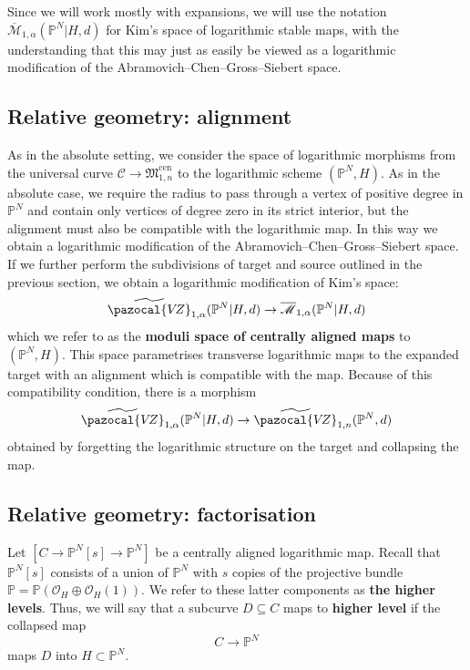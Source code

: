 \documentclass[11pt]{amsart}
\newcommand{\PP}{\mathbb P}
\newcommand{\VZ}{\pazocal{V\!Z}}
\renewcommand{\to}{\rightarrow}
\newcommand{\Mcal}{\mathcal{M}}
\newcommand{\ol}[1]{\overline{#1}}
\theoremstyle{definition}
\theoremstyle{definition}
\begin{document}
Since we will work mostly with expansions, we will use the notation
$\ol\Mcal_{1,\alpha}(\PP^N|H,d)$
for Kim's space of logarithmic stable maps, with the understanding that this may just as easily be viewed as a logarithmic modification of the Abramovich--Chen--Gross--Siebert space.

\subsection{Relative geometry: alignment} As in the absolute setting, we consider the space of logarithmic morphisms from the universal curve $\mathcal{C} \to \mathfrak{M}_{1,n}^{\mathrm{cen}}$ to the logarithmic scheme $(\PP^N,H)$. As in the absolute case, we require the radius to pass through a vertex of positive degree in $\PP^N$ and contain only vertices of degree zero in its strict interior, but the alignment must also be compatible with the logarithmic map. In this way we obtain a logarithmic modification of the Abramovich--Chen--Gross--Siebert space. If we further perform the subdivisions of target and source outlined in the previous section, we obtain a logarithmic modification of Kim's space:
\begin{equation*} \widetilde\VZ_{1,\alpha}(\PP^N|H,d) \to \ol\Mcal_{1,\alpha}(\PP^N|H,d)\end{equation*}
which we refer to as the \textbf{moduli space of centrally aligned maps} to $(\PP^N,H)$. This space parametrises transverse logarithmic maps to the expanded target with an alignment which is compatible with the map. Because of this compatibility condition, there is a morphism
\begin{equation*} \widetilde\VZ_{1,\alpha}(\PP^N|H,d) \to \widetilde\VZ_{1,n}(\PP^N,d)\end{equation*}
obtained by forgetting the logarithmic structure on the target and collapsing the map.


\subsection{Relative geometry: factorisation}\label{subsection factorisation} Let $[C\to \mathbb P^N[s]\to \mathbb P^N]$ be a centrally aligned logarithmic map. Recall that $\mathbb P^N[s]$ consists of a union of $\mathbb P^N$ with $s$ copies of the projective bundle $\mathbb{P} = \mathbb P(\mathcal O_H\oplus \mathcal O_H(1))$. We refer to these latter components as \textbf{the higher levels}. Thus, we will say that a subcurve $D\subseteq C$ maps to \textbf{higher level} if the collapsed map
\[
C\to \mathbb P^N
\]
maps $D$ into $H\subset \mathbb P^N$. 
\end{document}
